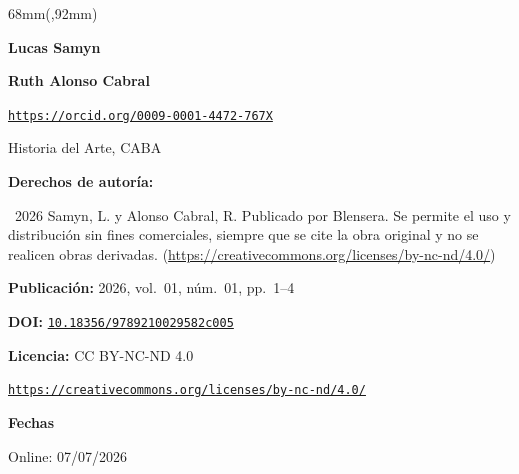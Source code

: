 \documentclass{article}
\newlength{\gbbloquex}
\begin{document}
\begin{textblock*}{68mm}(\gbbloquex,92mm)
{\setlength{\leftskip}{0pt}\setlength{\parindent}{0pt}%
\noindent\begin{minipage}[t]{68mm}
\sffamily\small\setlength{\parskip}{1pt}
{\bfseries\color{azulrevista}Lucas Samyn}\par
\vspace{4pt}
{\bfseries\color{azulrevista}Ruth Alonso Cabral}\par
{\scriptsize\texttt{\href{https://orcid.org/0009-0001-4472-767X}{https://orcid.org/0009-0001-4472-767X}}}\par
Historia del Arte, CABA\par
\vspace{6pt}
{\bfseries\color{azulrevista!70}Derechos de autor\'ia:}\par
\textcopyright\ 2026 Samyn, L. y Alonso Cabral, R. Publicado por Blensera. Se permite el uso y distribución sin fines comerciales, siempre que se cite la obra original y no se realicen obras derivadas. (\href{https://creativecommons.org/licenses/by-nc-nd/4.0/}{https://creativecommons.org/licenses/by-nc-nd/4.0/})\par\vspace{6pt}
{\bfseries\color{azulrevista!70}Publicación:} 2026, vol.~01, n\'um.~01, pp.~1--4\par\vspace{6pt}
{\bfseries\color{azulrevista!70}DOI:} {\scriptsize\texttt{\href{https://doi.org/10.18356/9789210029582c005}{10.18356/9789210029582c005}}}\par\vspace{6pt}
{\bfseries\color{azulrevista!70}Licencia:} CC BY-NC-ND 4.0\par
{\scriptsize\texttt{\href{https://creativecommons.org/licenses/by-nc-nd/4.0/}{https://creativecommons.org/licenses/by-nc-nd/4.0/}}}\par
\vspace{6pt}
{\bfseries\color{azulrevista!70}Fechas}\par\vspace{2pt}
Online: 07/07/2026\par
\vspace{6pt}
\end{minipage}%
}%
\end{textblock*}
\end{document}
